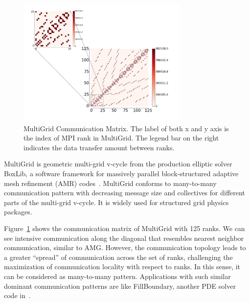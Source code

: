 \begin{figure}[htp]
    \centering
    \includegraphics[height=2.5in]{figs/appstudy/mg/mg_pip}
    \caption{MultiGrid Communication Matrix. 
    The label of both x and y axis is the index of MPI rank in MultiGrid. 
    The legend bar on the right indicates the data transfer amount between ranks.
    }
    \label{fig:mg-communication-topology}
\end{figure}

MultiGrid is geometric multi-grid v-cycle from the production elliptic solver BoxLib, 
a software framework for massively parallel block-structured adaptive mesh refinement (AMR) codes~\cite{boxlib}. 
MultiGrid conforms to many-to-many communication pattern with decreasing message size and 
collectives for different parts of the multi-grid v-cycle. 
It is widely used for structured grid physics packages. 

Figure~\ref{fig:mg-communication-topology} shows the communication matrix of MultiGrid with 125 ranks. 
We can see intensive communication along the diagonal that resembles nearest neighbor communication, similar to AMG. 
However, the communication topology leads to a greater ``spread'' of communication across the set of ranks, 
challenging the maximization of communication locality with respect to ranks. 
In this sense, it can be considered as many-to-many pattern. 
Applications with such similar dominant communication patterns are like FillBoundary, another PDE solver code in~\cite{boxlib}.


